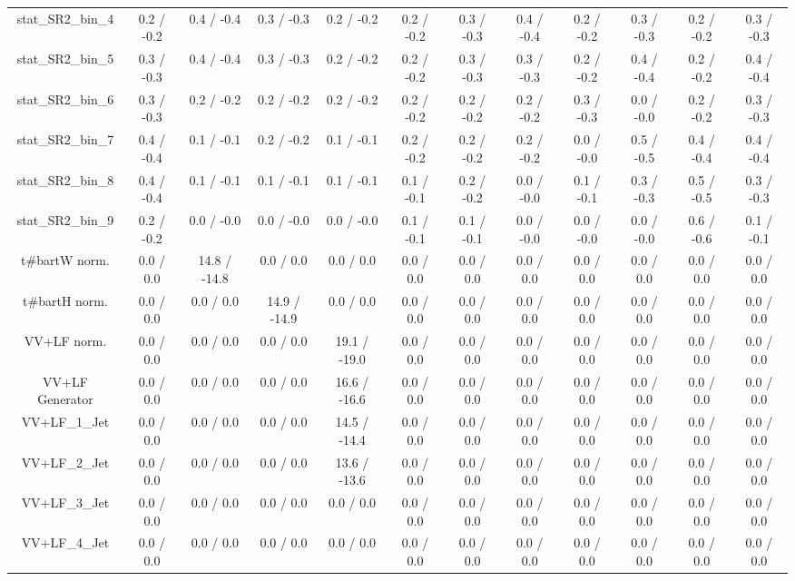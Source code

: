 \begin{table}[htbp]
\begin{center}
\begin{tabular}{|c|c|c|c|c|c|c|c|c|c|c|c|}
 stat_SR2_bin_4 & 0.2 / -0.2 & 0.4 / -0.4 & 0.3 / -0.3 & 0.2 / -0.2 & 0.2 / -0.2 & 0.3 / -0.3 & 0.4 / -0.4 & 0.2 / -0.2 & 0.3 / -0.3 & 0.2 / -0.2 & 0.3 / -0.3 \\ 
 stat_SR2_bin_5 & 0.3 / -0.3 & 0.4 / -0.4 & 0.3 / -0.3 & 0.2 / -0.2 & 0.2 / -0.2 & 0.3 / -0.3 & 0.3 / -0.3 & 0.2 / -0.2 & 0.4 / -0.4 & 0.2 / -0.2 & 0.4 / -0.4 \\ 
 stat_SR2_bin_6 & 0.3 / -0.3 & 0.2 / -0.2 & 0.2 / -0.2 & 0.2 / -0.2 & 0.2 / -0.2 & 0.2 / -0.2 & 0.2 / -0.2 & 0.3 / -0.3 & 0.0 / -0.0 & 0.2 / -0.2 & 0.3 / -0.3 \\ 
 stat_SR2_bin_7 & 0.4 / -0.4 & 0.1 / -0.1 & 0.2 / -0.2 & 0.1 / -0.1 & 0.2 / -0.2 & 0.2 / -0.2 & 0.2 / -0.2 & 0.0 / -0.0 & 0.5 / -0.5 & 0.4 / -0.4 & 0.4 / -0.4 \\ 
 stat_SR2_bin_8 & 0.4 / -0.4 & 0.1 / -0.1 & 0.1 / -0.1 & 0.1 / -0.1 & 0.1 / -0.1 & 0.2 / -0.2 & 0.0 / -0.0 & 0.1 / -0.1 & 0.3 / -0.3 & 0.5 / -0.5 & 0.3 / -0.3 \\ 
 stat_SR2_bin_9 & 0.2 / -0.2 & 0.0 / -0.0 & 0.0 / -0.0 & 0.0 / -0.0 & 0.1 / -0.1 & 0.1 / -0.1 & 0.0 / -0.0 & 0.0 / -0.0 & 0.0 / -0.0 & 0.6 / -0.6 & 0.1 / -0.1 \\ 
  t#bar{t}W norm. & 0.0 / 0.0 & 14.8 / -14.8 & 0.0 / 0.0 & 0.0 / 0.0 & 0.0 / 0.0 & 0.0 / 0.0 & 0.0 / 0.0 & 0.0 / 0.0 & 0.0 / 0.0 & 0.0 / 0.0 & 0.0 / 0.0 \\ 
  t#bar{t}H norm. & 0.0 / 0.0 & 0.0 / 0.0 & 14.9 / -14.9 & 0.0 / 0.0 & 0.0 / 0.0 & 0.0 / 0.0 & 0.0 / 0.0 & 0.0 / 0.0 & 0.0 / 0.0 & 0.0 / 0.0 & 0.0 / 0.0 \\ 
  VV+LF norm. & 0.0 / 0.0 & 0.0 / 0.0 & 0.0 / 0.0 & 19.1 / -19.0 & 0.0 / 0.0 & 0.0 / 0.0 & 0.0 / 0.0 & 0.0 / 0.0 & 0.0 / 0.0 & 0.0 / 0.0 & 0.0 / 0.0 \\ 
  VV+LF Generator & 0.0 / 0.0 & 0.0 / 0.0 & 0.0 / 0.0 & 16.6 / -16.6 & 0.0 / 0.0 & 0.0 / 0.0 & 0.0 / 0.0 & 0.0 / 0.0 & 0.0 / 0.0 & 0.0 / 0.0 & 0.0 / 0.0 \\ 
  VV+LF_1_Jet & 0.0 / 0.0 & 0.0 / 0.0 & 0.0 / 0.0 & 14.5 / -14.4 & 0.0 / 0.0 & 0.0 / 0.0 & 0.0 / 0.0 & 0.0 / 0.0 & 0.0 / 0.0 & 0.0 / 0.0 & 0.0 / 0.0 \\ 
  VV+LF_2_Jet & 0.0 / 0.0 & 0.0 / 0.0 & 0.0 / 0.0 & 13.6 / -13.6 & 0.0 / 0.0 & 0.0 / 0.0 & 0.0 / 0.0 & 0.0 / 0.0 & 0.0 / 0.0 & 0.0 / 0.0 & 0.0 / 0.0 \\ 
  VV+LF_3_Jet & 0.0 / 0.0 & 0.0 / 0.0 & 0.0 / 0.0 & 0.0 / 0.0 & 0.0 / 0.0 & 0.0 / 0.0 & 0.0 / 0.0 & 0.0 / 0.0 & 0.0 / 0.0 & 0.0 / 0.0 & 0.0 / 0.0 \\ 
  VV+LF_4_Jet & 0.0 / 0.0 & 0.0 / 0.0 & 0.0 / 0.0 & 0.0 / 0.0 & 0.0 / 0.0 & 0.0 / 0.0 & 0.0 / 0.0 & 0.0 / 0.0 & 0.0 / 0.0 & 0.0 / 0.0 & 0.0 / 0.0 \\ 

\end{tabular}
\end{center}
\end{table}
